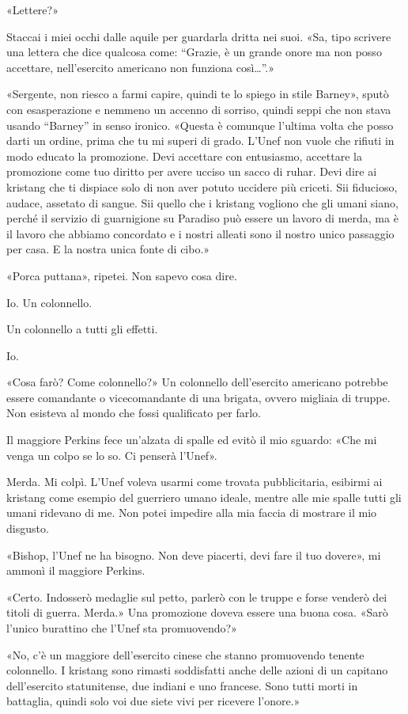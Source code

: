 «Lettere?»

Staccai i miei occhi dalle aquile per guardarla dritta nei suoi. «Sa,
tipo scrivere una lettera che dice qualcosa come: ``Grazie, è un grande
onore ma non posso accettare, nell'esercito americano non funziona
così\ldots''.»

«Sergente, non riesco a farmi capire, quindi te lo spiego in stile
Barney», sputò con esasperazione e nemmeno un accenno di sorriso, quindi
seppi che non stava usando ``Barney'' in senso ironico. «Questa è
comunque l'ultima volta che posso darti un ordine, prima che tu mi
superi di grado. L'Unef non vuole che rifiuti in modo educato la
promozione. Devi accettare con entusiasmo, accettare la promozione come
tuo diritto per avere ucciso un sacco di ruhar. Devi dire ai kristang
che ti dispiace solo di non aver potuto uccidere più criceti. Sii
fiducioso, audace, assetato di sangue. Sii quello che i kristang
vogliono che gli umani siano, perché il servizio di guarnigione su
Paradiso può essere un lavoro di merda, ma è il lavoro che abbiamo
concordato e i nostri alleati sono il nostro unico passaggio per casa. E
la nostra unica fonte di cibo.»

«Porca puttana», ripetei. Non sapevo cosa dire.

Io. Un colonnello.

Un colonnello a tutti gli effetti.

Io.

«Cosa farò? Come colonnello?» Un colonnello dell'esercito americano
potrebbe essere comandante o vicecomandante di una brigata, ovvero
migliaia di truppe. Non esisteva al mondo che fossi qualificato per
farlo.

Il maggiore Perkins fece un'alzata di spalle ed evitò il mio sguardo:
«Che mi venga un colpo se lo so. Ci penserà l'Unef».

Merda. Mi colpì. L'Unef voleva usarmi come trovata pubblicitaria,
esibirmi ai kristang come esempio del guerriero umano ideale, mentre
alle mie spalle tutti gli umani ridevano di me. Non potei impedire alla
mia faccia di mostrare il mio disgusto.

«Bishop, l'Unef ne ha bisogno. Non deve piacerti, devi fare il tuo
dovere», mi ammonì il maggiore Perkins.

«Certo. Indosserò medaglie sul petto, parlerò con le truppe e forse
venderò dei titoli di guerra. Merda.» Una promozione doveva essere una
buona cosa. «Sarò l'unico burattino che l'Unef sta promuovendo?»

«No, c'è un maggiore dell'esercito cinese che stanno promuovendo tenente
colonnello. I kristang sono rimasti soddisfatti anche delle azioni di un
capitano dell'esercito statunitense, due indiani e uno francese. Sono
tutti morti in battaglia, quindi solo voi due siete vivi per ricevere
l'onore.»

